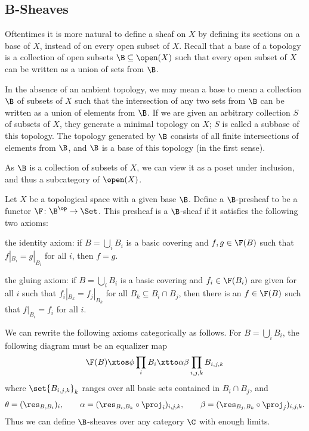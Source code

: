 \subsection{B-Sheaves}

Oftentimes it is more natural to define a sheaf on $X$ by defining its sections on a base of $X$, instead of on every open subset of $X$.
Recall that a base of a topology is a collection of open subsets $\B\subseteq\open(X)$ such that every open subset of $X$ can be written as
a union of sets from $\B$.

In the absence of an ambient topology, we may mean a base to mean a collection $\B$ of subsets of $X$ such that the intersection of any two
sets from $\B$ can be written as a union of elements from $\B$.
If we are given an arbitrary collection $S$ of subsets of $X$, they generate a minimal topology on $X$; $S$ is called a {\emphcolor subbase} of this
topology.
The topology generated by $\B$ consists of all finite intersections of elements from $\B$, and $\B$ is a base of this topology (in the first sense).

As $\B$ is a collection of subsets of $X$, we can view it as a poset under inclusion, and thus a subcategory of $\open(X)$.

\bdefn[title={B-Sheaves}]

    Let $X$ be a topological space with a given base $\B$.
    Define a {\emphcolor $\B$-presheaf} to be a functor $\F\colon\B^\op\to\Set$.
    This presheaf is a {\emphcolor $\B$-sheaf} if it satisfies the following two axioms:
    \benum
        \item the {\emphcolor identity axiom}: if $B=\bigcup_iB_i$ is a basic covering and $f,g\in\F(B)$ such that $f|_{B_i}=g|_{B_i}$
        for all $i$, then $f=g$.
        \item the {\emphcolor gluing axiom}: if $B=\bigcup_iB_i$ is a basic covering and $f_i\in\F(B_i)$ are given for all $i$ such that
        $f_i|_{B_k}=f_j|_{B_k}$ for all $B_k\subseteq B_i\cap B_j$, then there is an $f\in\F(B)$ such that $f|_{B_i}=f_i$ for all $i$.
    \eenum

\edefn

We can rewrite the following axioms categorically as follows.
For $B=\bigcup_iB_i$, the following diagram must be an equalizer map
$$ \F(B) \xtos\phi \prod_iB_i \xtto\alpha\beta \prod_{i,j,k}B_{i,j,k} $$
where $\set{B_{i,j,k}}_k$ ranges over all basic sets contained in $B_i\cap B_j$, and
$$ \theta = (\res_{B,B_i})_i,\qquad \alpha = (\res_{B_i,B_k}\circ\proj_i)_{i,j,k},\qquad \beta = (\res_{B_j,B_k}\circ\proj_j)_{i,j,k} . $$
Thus we can define $\B$-sheaves over any category $\C$ with enough limits.

